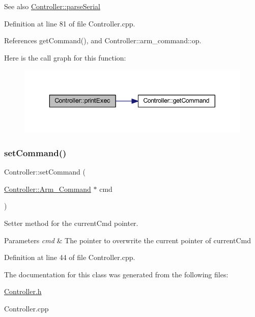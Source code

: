 \begin{DoxySeeAlso}{See also}
\hyperlink{class_controller_ad7583687bca402756ed9a4a8dc2e29ee}{Controller\+::parse\+Serial} 
\end{DoxySeeAlso}


Definition at line 81 of file Controller.\+cpp.



References get\+Command(), and Controller\+::arm\+\_\+command\+::op.

Here is the call graph for this function\+:
\nopagebreak
\begin{figure}[H]
\begin{center}
\leavevmode
\includegraphics[width=343pt]{class_controller_a8ad1d152a91997ab3825f32d2dcecfd4_cgraph}
\end{center}
\end{figure}
\mbox{\label{class_controller_a951ce5ec5a6e653e9dd78b36351d80c5}} 
\subsubsection{\texorpdfstring{set\+Command()}{setCommand()}}
{\footnotesize\ttfamily Controller\+::set\+Command (\begin{DoxyParamCaption}\item[{\hyperlink{class_controller_ac48cc99091f83f149fef8f17fd5d7e7f}{Controller\+::\+Arm\+\_\+\+Command} $\ast$}]{cmd }\end{DoxyParamCaption})}



Setter method for the current\+Cmd pointer. 


\begin{DoxyParams}{Parameters}
{\em cmd} & The pointer to overwrite the current pointer of current\+Cmd \\
\hline
\end{DoxyParams}


Definition at line 44 of file Controller.\+cpp.



The documentation for this class was generated from the following files\+:\begin{DoxyCompactItemize}
\item 
\hyperlink{_controller_8h}{Controller.\+h}\item 
Controller.\+cpp\end{DoxyCompactItemize}
